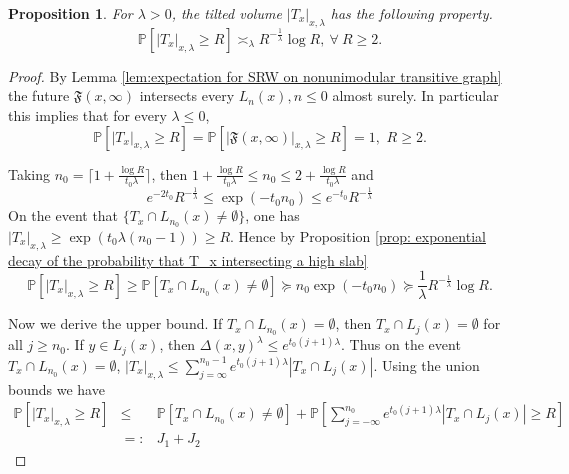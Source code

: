 \documentclass[12pt]{article}
\newtheorem{proposition}[theorem]{Proposition}
\numberwithin{equation}{section}
\newcommand{\be}{\begin{equation}}
\newcommand{\ee}{\end{equation}}
\newcommand{\1}{\mathbf{1}}
\begin{document}
\begin{proposition}\label{prop: tail prob for general case}
	For $\lambda>0$, the tilted volume $|T_x|_{x,\lambda}$ has the following property.
	\be\label{eq:bounds for tail prob of general case}
		 \mathbb{P}[|T_x|_{x,\lambda}\geq R]\asymp_{\lambda} R^{-\frac{1}{\lambda}}\log R , \ \forall\  R\geq 2.
		\ee

\end{proposition}



 
 
 
 
 
 \begin{proof}
   By Lemma \ref{lem:expectation for SRW on nonunimodular transitive graph} the future $\mathfrak{F}(x,\infty)$ intersects every $L_n(x),n\leq 0$ almost surely. In particular this implies that for every $\lambda\leq0$,  
   \be\label{eq: tilted volume is infinite for T_x and the future with nonpositive lambda}
   \mathbb{P}[|T_x|_{x,\lambda}\geq R]=\mathbb{P}[|\mathfrak{F}(x,\infty)|_{x,\lambda}\geq R]=1,\,\,R\geq 2.
   \ee	
 	
 
 		Taking $n_0=\lceil1+\frac{\log R}{t_0\lambda} \rceil$, then $1+\frac{\log R}{t_0\lambda} \leq n_0\leq 2+\frac{\log R}{t_0\lambda}$ and 
 		\be\label{eq: choice of n_0 in terms of R}
 		e^{-2t_0}R^{-\frac{1}{\lambda}}\leq \exp(-t_0n_0)\leq 	e^{-t_0}R^{-\frac{1}{\lambda}}
 		\ee
 		On the event that $\{T_x\cap L_{n_0}(x)\neq \emptyset \}$, one has $|T_x|_{x,\lambda}\geq   \exp(t_0\lambda (n_0-1))\geq R$. Hence by Proposition \ref{prop: exponential decay of the probability that T_x intersecting a high slab}
 		\[
 		\mathbb{P}[|T_x|_{x,\lambda}\geq R]\geq \mathbb{P}[T_x\cap L_{n_0}(x)\neq \emptyset ]
 		\succeq n_0\exp(-t_0n_0)\succeq\frac{1}{\lambda} R^{-\frac{1}{\lambda}}\log R.
 		\]
 		
 		
 		Now we derive the upper bound. If $T_x\cap L_{n_0}(x)= \emptyset$, then $T_x\cap L_{j}(x)= \emptyset$ for all $j\geq n_0$. If $y\in L_j(x)$, then $\Delta(x,y)^\lambda\leq e^{t_0(j+1)\lambda}$. Thus on the event $T_x\cap L_{n_0}(x)= \emptyset$, $|T_x|_{x,\lambda}\leq \sum_{j=\infty}^{n_0-1}e^{t_0(j+1)\lambda}|T_x\cap L_j(x)|$. 
 		Using the union bounds we have 
 		\begin{eqnarray}
 		\mathbb{P}[|T_x|_{x,\lambda}\geq R]
 		&\leq& \mathbb{P}[T_x\cap L_{n_0}(x)\neq \emptyset]+\mathbb{P}\left[
 		\sum_{j=-\infty}^{n_0}e^{t_0(j+1)\lambda}|T_x\cap L_j(x)|\geq R\right]\nonumber\\
 		&=:&J_1+J_2
 		\end{eqnarray}
 		

\end{proof}
\end{document}
